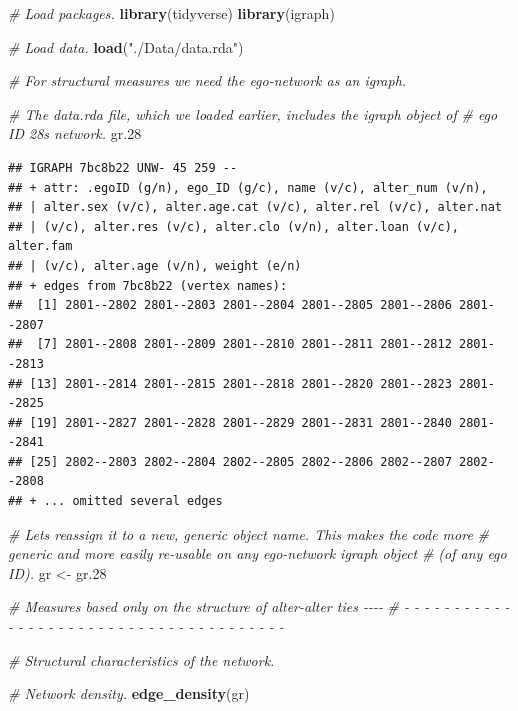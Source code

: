 \documentclass[
]{book}
\newenvironment{Shaded}{\begin{snugshade}}{\end{snugshade}}
\newcommand{\CommentTok}[1]{\textcolor[rgb]{0.56,0.35,0.01}{\textit{#1}}}
\newcommand{\FloatTok}[1]{\textcolor[rgb]{0.00,0.00,0.81}{#1}}
\newcommand{\FunctionTok}[1]{\textcolor[rgb]{0.13,0.29,0.53}{\textbf{#1}}}
\newcommand{\NormalTok}[1]{#1}
\newcommand{\OtherTok}[1]{\textcolor[rgb]{0.56,0.35,0.01}{#1}}
\newcommand{\StringTok}[1]{\textcolor[rgb]{0.31,0.60,0.02}{#1}}
\begin{document}
\begin{Shaded}
\begin{Highlighting}[]
\CommentTok{\# Load packages.}
\FunctionTok{library}\NormalTok{(tidyverse)}
\FunctionTok{library}\NormalTok{(igraph)}

\CommentTok{\# Load data.}
\FunctionTok{load}\NormalTok{(}\StringTok{"./Data/data.rda"}\NormalTok{)}

\CommentTok{\# For structural measures we need the ego{-}network as an igraph.}

\CommentTok{\# The data.rda file, which we loaded earlier, includes the igraph object of}
\CommentTok{\# ego ID 28\textquotesingle{}s network.}
\NormalTok{gr}\FloatTok{.28}
\end{Highlighting}
\end{Shaded}

\begin{verbatim}
## IGRAPH 7bc8b22 UNW- 45 259 -- 
## + attr: .egoID (g/n), ego_ID (g/c), name (v/c), alter_num (v/n),
## | alter.sex (v/c), alter.age.cat (v/c), alter.rel (v/c), alter.nat
## | (v/c), alter.res (v/c), alter.clo (v/n), alter.loan (v/c), alter.fam
## | (v/c), alter.age (v/n), weight (e/n)
## + edges from 7bc8b22 (vertex names):
##  [1] 2801--2802 2801--2803 2801--2804 2801--2805 2801--2806 2801--2807
##  [7] 2801--2808 2801--2809 2801--2810 2801--2811 2801--2812 2801--2813
## [13] 2801--2814 2801--2815 2801--2818 2801--2820 2801--2823 2801--2825
## [19] 2801--2827 2801--2828 2801--2829 2801--2831 2801--2840 2801--2841
## [25] 2802--2803 2802--2804 2802--2805 2802--2806 2802--2807 2802--2808
## + ... omitted several edges
\end{verbatim}

\begin{Shaded}
\begin{Highlighting}[]
\CommentTok{\# Let\textquotesingle{}s reassign it to a new, generic object name. This makes the code more }
\CommentTok{\# generic and more easily re{-}usable on any ego{-}network igraph object }
\CommentTok{\# (of any ego ID).}
\NormalTok{gr }\OtherTok{\textless{}{-}}\NormalTok{ gr}\FloatTok{.28}

\CommentTok{\# Measures based only on the structure of alter{-}alter ties                  {-}{-}{-}{-}}
\CommentTok{\# {-} {-} {-} {-} {-} {-} {-} {-} {-} {-} {-} {-} {-} {-} {-} {-} {-} {-} {-} {-} {-} {-} {-} {-} {-} {-} {-} {-} {-} {-} {-} {-} {-} {-} {-} {-} {-} {-} {-} }

\CommentTok{\# Structural characteristics of the network.}

\CommentTok{\# Network density.}
\FunctionTok{edge\_density}\NormalTok{(gr)}
\end{Highlighting}
\end{Shaded}
\end{document}
